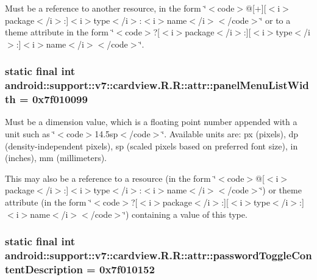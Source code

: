 Must be a reference to another resource, in the form \char`\"{}$<$code$>$@\mbox{[}+\mbox{]}\mbox{[}$<$i$>$package$<$/i$>$:\mbox{]}$<$i$>$type$<$/i$>$:$<$i$>$name$<$/i$>$$<$/code$>$\char`\"{} or to a theme attribute in the form \char`\"{}$<$code$>$?\mbox{[}$<$i$>$package$<$/i$>$:\mbox{]}\mbox{[}$<$i$>$type$<$/i$>$:\mbox{]}$<$i$>$name$<$/i$>$$<$/code$>$\char`\"{}. \hypertarget{classandroid_1_1support_1_1v7_1_1cardview_1_1_r_1_1attr_df0f92ce375669ad9cacc29288b8d980}{
\subsubsection[{panelMenuListWidth}]{\setlength{\rightskip}{0pt plus 5cm}static final int android::support::v7::cardview.R.R::attr::panelMenuListWidth = 0x7f010099}}
\label{classandroid_1_1support_1_1v7_1_1cardview_1_1_r_1_1attr_df0f92ce375669ad9cacc29288b8d980}


Must be a dimension value, which is a floating point number appended with a unit such as \char`\"{}$<$code$>$14.5sp$<$/code$>$\char`\"{}. Available units are: px (pixels), dp (density-independent pixels), sp (scaled pixels based on preferred font size), in (inches), mm (millimeters). 

This may also be a reference to a resource (in the form \char`\"{}$<$code$>$@\mbox{[}$<$i$>$package$<$/i$>$:\mbox{]}$<$i$>$type$<$/i$>$:$<$i$>$name$<$/i$>$$<$/code$>$\char`\"{}) or theme attribute (in the form \char`\"{}$<$code$>$?\mbox{[}$<$i$>$package$<$/i$>$:\mbox{]}\mbox{[}$<$i$>$type$<$/i$>$:\mbox{]}$<$i$>$name$<$/i$>$$<$/code$>$\char`\"{}) containing a value of this type. \hypertarget{classandroid_1_1support_1_1v7_1_1cardview_1_1_r_1_1attr_f62fd69dd794e5e7c7d8119057d8a546}{
\subsubsection[{passwordToggleContentDescription}]{\setlength{\rightskip}{0pt plus 5cm}static final int android::support::v7::cardview.R.R::attr::passwordToggleContentDescription = 0x7f010152}}
\label{classandroid_1_1support_1_1v7_1_1cardview_1_1_r_1_1attr_f62fd69dd794e5e7c7d8119057d8a546}


